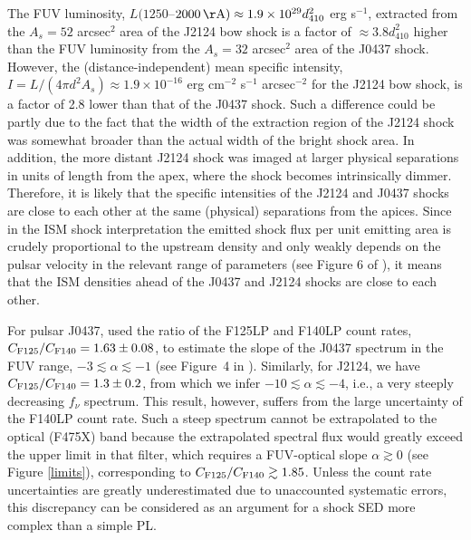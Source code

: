 \documentclass[iop]{emulateapj}
\begin{document}
The FUV luminosity, $L(1250$--$2000\,{\rm \AA}) \approx 1.9\times 10^{29} d_{410}^2$ erg s$^{-1}$, extracted from the $A_s=52$ arcsec$^2$ area of the J2124 bow shock is a factor of $\approx 3.8d_{410}^2$ higher than the FUV luminosity from the $A_s=32$ arcsec$^2$ area of the J0437 shock. However, the (distance-independent) mean specific intensity, $I=L/(4\pi d^2 A_s) \approx 1.9\times 10^{-16}$ erg cm$^{-2}$ s$^{-1}$ arcsec$^{-2}$ for the J2124 bow shock, is a factor of 2.8 lower than that of the J0437 shock. Such a difference could be partly due to the fact that the width of the extraction region of the J2124 shock was somewhat broader than the actual width of the bright shock area. In addition, the more distant J2124 shock was imaged at larger physical separations in units of length from the apex, where the shock becomes intrinsically dimmer. Therefore, it is likely that the specific intensities of the J2124 and J0437 shocks are close to each other  at the same (physical) separations from the apices. Since in the ISM shock interpretation the emitted shock flux per unit emitting area is crudely proportional to the upstream density and only weakly depends on the pulsar velocity in the relevant range of parameters (see Figure 6 of \citealt{2016ApJ...831..129R}), it means that the ISM densities ahead of the J0437 and J2124 shocks
are close to each other.

For pulsar J0437, \cite{2016ApJ...831..129R} used the ratio of the F125LP and F140LP count rates, $C_{\rm F125}/C_{\rm F140} = 1.63\pm 0.08$, to estimate the slope of the J0437 spectrum in the FUV range, $-3\lesssim\alpha\lesssim -1$ (see Figure~4 in \citealt{2016ApJ...831..129R}). Similarly, for J2124, we have $C_{\rm F125}/C_{\rm F140} = 1.3\pm0.2$, from which we infer $-10\lesssim\alpha\lesssim -4$, i.e., a very steeply decreasing $f_\nu$ spectrum. This result, however, suffers from the large uncertainty of the F140LP count rate. Such a steep spectrum cannot be extrapolated to the optical (F475X) band because the extrapolated spectral flux would greatly exceed the upper limit in that filter, which requires a FUV-optical slope $\alpha\gtrsim 0$ (see Figure \ref{limits}), corresponding to $C_{\rm F125}/C_{\rm F140}\gtrsim 1.85$. Unless the count rate uncertainties are greatly underestimated due to unaccounted systematic errors, this discrepancy can be considered as an argument for a shock SED more 
complex than a simple PL.
\end{document}
